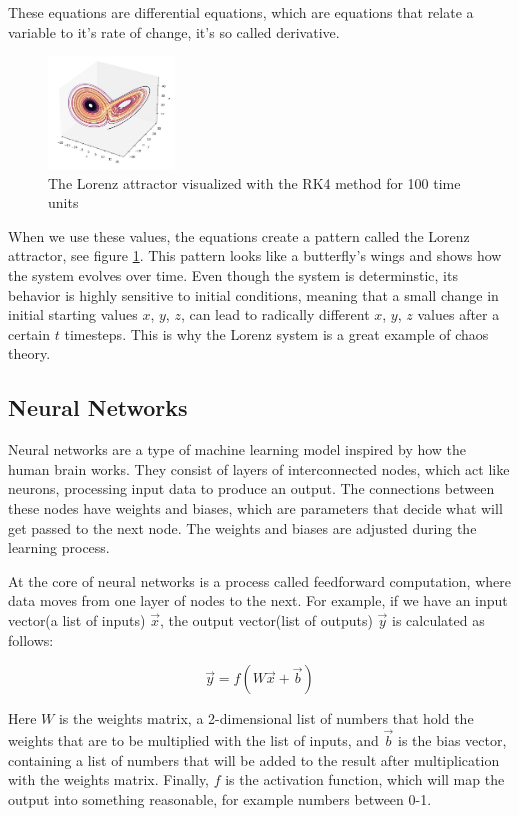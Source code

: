 \documentclass[11pt]{article}
\begin{document}
 These equations are differential equations, which are equations that relate a variable to it's rate of change, it's so called derivative. 
\begin{figure}[h]

\centering
\includegraphics[width=0.3\textwidth]{lorenz_attractor.jpeg}
\caption{The Lorenz attractor visualized with the RK4 method for 100 time units}
\label{fig:lorenz_attractor}
\end{figure}

 When we use these values, the equations create a pattern called the Lorenz attractor, see figure \ref{fig:lorenz_attractor}. This pattern looks like a butterfly's wings and shows how the system evolves over time. Even though the system is determinstic, its behavior is highly sensitive to initial conditions, meaning that a small change in initial starting values $x$, $y$, $z$, can lead to radically different $x$, $y$, $z$ values after a certain $t$ timesteps. This is why the Lorenz system is a great example of chaos theory.


\subsection{Neural Networks}

Neural networks are a type of machine learning model inspired by how the human brain works. They consist of layers of interconnected nodes, which act like neurons, processing input data to produce an output. The connections between these nodes have weights and biases, which are parameters that decide what will get passed to the next node. The weights and biases are adjusted during the learning process.

At the core of neural networks is a process called feedforward computation, where data moves from one layer of nodes to the next. For example, if we have an input vector(a list of inputs) \(\vec{x}\), the output vector(list of outputs) \(\vec{y}\) is calculated as follows:

\[ \vec{y} = f(W\vec{x} + \vec{b}) \]

Here $W$ is the weights matrix, a 2-dimensional list of numbers that hold the weights that are to be multiplied with the list of inputs, and $\vec{b}$ is the bias vector, containing a list of numbers that will be added to the result after multiplication with the weights matrix. Finally, $f$ is the activation function, which will map the output into something reasonable, for example numbers between 0-1.
\end{document}
